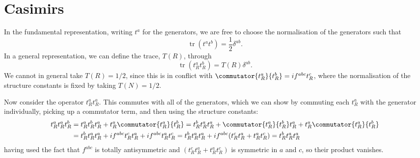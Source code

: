 \documentclass[fleqn]{NotesClass}
\DeclareMathOperator{\tr}{tr}
\begin{document}
    \section{Casimirs}
    In the fundamental representation, writing \(t^a\) for the generators, we are free to choose the normalisation of the generators such that
    \begin{equation}
        \tr(t^at^b) = \frac{1}{2}\delta^{ab}.
    \end{equation}
    In a general representation, we can define the trace, \(T(R)\), through
    \begin{equation}
        \tr(t_R^at_R^b) = T(R)\delta^{ab}.
    \end{equation}
    We cannot in general take \(T(R) = 1/2\), since this is in conflict with \(\commutator{t_R^a}{t_R^b} = if^{abc}t_R^c\), where the normalisation of the structure constants is fixed by taking \(T(N) = 1/2\).
    
    Now consider the operator \(t_R^a t_R^a\).
    This commutes with all of the generators, which we can show by commuting each \(t_R^a\) with the generator individually, picking up a commutator term, and then using the structure constants:
    \begin{align}
        t_R^at_R^at_R^b &= t_R^at_R^bt_R^a + t_R^a\commutator{t_R^a}{t_R^b} = t_R^bt_R^at_R^a + \commutator{t_R^a}{t_R^b}t_R^a + t_R^a\commutator{t_R^a}{t_R^b}\\
        &= t_R^bt_R^at_R^a + if^{abc}t_R^ct_R^a + if^{abc}t_R^at_R^c = t_R^bt_R^at_R^a + if^{abc}(t_R^ct_R^a + t_R^at_R^c) = t_R^bt_R^at_R^a \notag
    \end{align}
    having used the fact that \(f^{abc}\) is totally antisymmetric and \((t_R^ct_R^a + t_R^at_R^c)\) is symmetric in \(a\) and \(c\), so their product vanishes.
    
\end{document}
